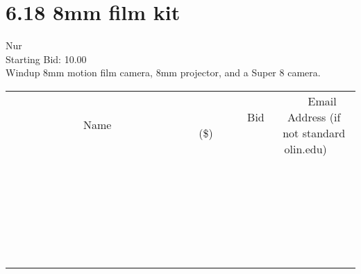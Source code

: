 \documentclass[11pt]{article}
\begin{document}
					\section*{6.18 8mm film kit}
					Nur \\
					Starting Bid: 10.00 \\
					Windup 8mm motion film camera, 8mm projector, and a Super 8 camera. \\
					[6ex]
					\begin{tabular}{c c c}
						~~~~~~~~~~~~~Name~~~~~~~~~~~~~ & ~~~~~~~~~Bid (\$)~~~~~~~~~ & ~~~Email Address (if not standard olin.edu)~~~ \\
				
 & & \\
\hline
 & & \\
\hline
 & & \\
\hline
 & & \\
\hline
 & & \\
\hline
 & & \\
\hline
 & & \\
\hline
 & & \\
\hline
 & & \\
\hline
 & & \\
\hline
 & & \\
\hline
 & & \\
\hline
 & & \\
\hline
 & & \\
\hline
 & & \\
\hline
 & & \\
\hline
 & & \\
\hline
 & & \\
\hline
 & & \\
\hline
 & & \\
\hline
 & & \\
\hline
 & & \\
\hline
 & & \\
\hline
 & & \\
\hline
 & & \\
\hline
 & & \\
\hline
					\end{tabular}
					\clearpage
				
\end{document}
